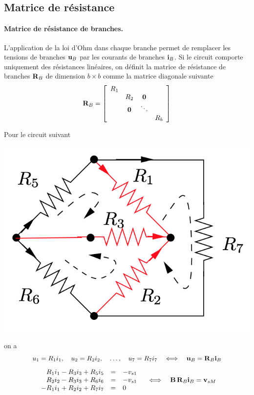 \subsection{Matrice de résistance}
\paragraph{Matrice de résistance de branches.} %
L'application de la loi d'Ohm dans chaque branche permet de remplacer les tensions de branches ${\bf u}_B$ par les courants de branches ${\bf i}_B$. Si le circuit comporte uniquement des résistances linéaires, on définit la matrice de résistance de branches ${\bf R}_B$ de dimension $b \times b$ comme la matrice diagonale suivante
\[{\bf R}_B = \left[
\begin{array}{cccc}
R_1 & \\
& R_2 & {\bf 0} & \\
&  {\bf 0} & \ddots \\
& & & R_b
\end{array} \right]\]

\begin{testexample}
	Pour le circuit suivant
	\begin{center}
	\includegraphics[width=0.4\linewidth]{figs/methodes-generales/m_mailles_4}
	\end{center}
	on a 
	{\small \[
	u_1 =  R_1 i_{1}, \quad 
	u_2 =  R_2 i_{2}, \quad 
	\ldots , \quad 
	u_7 =  R_7 i_{7}
	\quad \Longleftrightarrow \quad {\bf u}_B = {\bf R}_B {\bf i}_B
	\]
	\[\begin{array}{rcl}
	R_1 i_1-R_3 i_3+R_5 i_5 & = & -v_{s1}\\
	R_2 i_2-R_3 i_3+R_6 i_6 & = & -v_{s1}\\
	-R_1 i_1+R_2 i_2 + R_7 i_7 & = & 0
	\end{array}
	\quad \Longleftrightarrow \quad {\bf B}\,{\bf R}_B{\bf i}_B = {\bf v}_{sM}
	\]}
\end{testexample}

